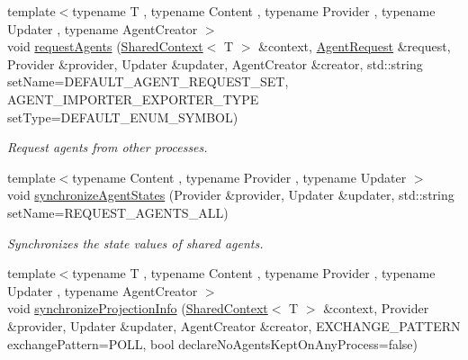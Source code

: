 \begin{DoxyCompactItemize}
\item 
{\footnotesize template$<$typename T , typename Content , typename Provider , typename Updater , typename Agent\-Creator $>$ }\\void \hyperlink{classrepast_1_1_repast_process_af295e322c0902a49ce530fc907b698d3}{request\-Agents} (\hyperlink{classrepast_1_1_shared_context}{Shared\-Context}$<$ T $>$ \&context, \hyperlink{classrepast_1_1_agent_request}{Agent\-Request} \&request, Provider \&provider, Updater \&updater, Agent\-Creator \&creator, std\-::string set\-Name=D\-E\-F\-A\-U\-L\-T\-\_\-\-A\-G\-E\-N\-T\-\_\-\-R\-E\-Q\-U\-E\-S\-T\-\_\-\-S\-E\-T, A\-G\-E\-N\-T\-\_\-\-I\-M\-P\-O\-R\-T\-E\-R\-\_\-\-E\-X\-P\-O\-R\-T\-E\-R\-\_\-\-T\-Y\-P\-E set\-Type=D\-E\-F\-A\-U\-L\-T\-\_\-\-E\-N\-U\-M\-\_\-\-S\-Y\-M\-B\-O\-L)
\begin{DoxyCompactList}\small\item\em Request agents from other processes. \end{DoxyCompactList}\item 
{\footnotesize template$<$typename Content , typename Provider , typename Updater $>$ }\\void \hyperlink{classrepast_1_1_repast_process_a6bf1b59d9939755fedc53264fdb335db}{synchronize\-Agent\-States} (Provider \&provider, Updater \&updater, std\-::string set\-Name=R\-E\-Q\-U\-E\-S\-T\-\_\-\-A\-G\-E\-N\-T\-S\-\_\-\-A\-L\-L)
\begin{DoxyCompactList}\small\item\em Synchronizes the state values of shared agents. \end{DoxyCompactList}\item 
\hypertarget{classrepast_1_1_repast_process_ac630e9787be913cb1101fcba3d6c60a7}{{\footnotesize template$<$typename T , typename Content , typename Provider , typename Updater , typename Agent\-Creator $>$ }\\void \hyperlink{classrepast_1_1_repast_process_ac630e9787be913cb1101fcba3d6c60a7}{synchronize\-Projection\-Info} (\hyperlink{classrepast_1_1_shared_context}{Shared\-Context}$<$ T $>$ \&context, Provider \&provider, Updater \&updater, Agent\-Creator \&creator, E\-X\-C\-H\-A\-N\-G\-E\-\_\-\-P\-A\-T\-T\-E\-R\-N exchange\-Pattern=P\-O\-L\-L, bool declare\-No\-Agents\-Kept\-On\-Any\-Process=false)}\label{classrepast_1_1_repast_process_ac630e9787be913cb1101fcba3d6c60a7}


\end{DoxyCompactItemize}
